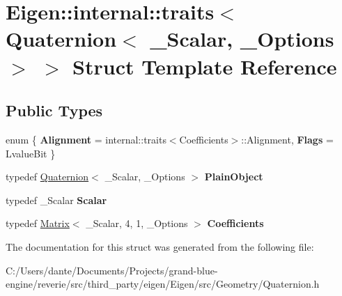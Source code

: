 \hypertarget{struct_eigen_1_1internal_1_1traits_3_01_quaternion_3_01___scalar_00_01___options_01_4_01_4}{}\section{Eigen\+::internal\+::traits$<$ Quaternion$<$ \+\_\+\+Scalar, \+\_\+\+Options $>$ $>$ Struct Template Reference}
\label{struct_eigen_1_1internal_1_1traits_3_01_quaternion_3_01___scalar_00_01___options_01_4_01_4}
\subsection*{Public Types}
\begin{DoxyCompactItemize}
\item 
\mbox{\label{struct_eigen_1_1internal_1_1traits_3_01_quaternion_3_01___scalar_00_01___options_01_4_01_4_af6a3dd95663b0e7d33f16f2dc9f6cdcc}} 
enum \{ {\bfseries Alignment} = internal\+::traits$<$Coefficients$>$\+::Alignment, 
{\bfseries Flags} = Lvalue\+Bit
 \}
\item 
\mbox{\label{struct_eigen_1_1internal_1_1traits_3_01_quaternion_3_01___scalar_00_01___options_01_4_01_4_aa4df82695cfa29ce9a7e9beab75dc1bf}} 
typedef \mbox{\hyperlink{class_eigen_1_1_quaternion}{Quaternion}}$<$ \+\_\+\+Scalar, \+\_\+\+Options $>$ {\bfseries Plain\+Object}
\item 
\mbox{\label{struct_eigen_1_1internal_1_1traits_3_01_quaternion_3_01___scalar_00_01___options_01_4_01_4_ae08389cd2248d4a2c189cdf99f912b41}} 
typedef \+\_\+\+Scalar {\bfseries Scalar}
\item 
\mbox{\label{struct_eigen_1_1internal_1_1traits_3_01_quaternion_3_01___scalar_00_01___options_01_4_01_4_aa514803b2bece105b57a80070738a308}} 
typedef \mbox{\hyperlink{class_eigen_1_1_matrix}{Matrix}}$<$ \+\_\+\+Scalar, 4, 1, \+\_\+\+Options $>$ {\bfseries Coefficients}
\end{DoxyCompactItemize}


The documentation for this struct was generated from the following file\+:\begin{DoxyCompactItemize}
\item 
C\+:/\+Users/dante/\+Documents/\+Projects/grand-\/blue-\/engine/reverie/src/third\+\_\+party/eigen/\+Eigen/src/\+Geometry/Quaternion.\+h\end{DoxyCompactItemize}
